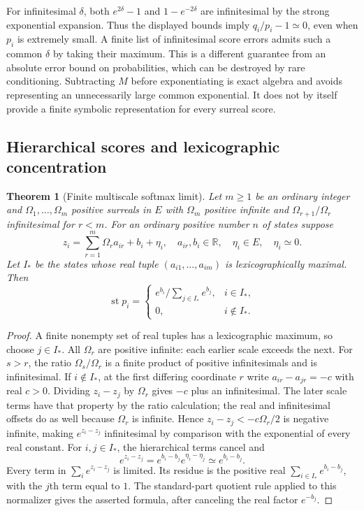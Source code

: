 \documentclass[11pt,a4paper]{article}
\numberwithin{equation}{section}
\newtheorem{theorem}{Theorem}[section]
\theoremstyle{definition}
\theoremstyle{remark}
\newcommand{\R}{\mathbb R}
\newcommand{\st}{\operatorname{st}}
\begin{document}
For infinitesimal $\delta$, both $e^{2\delta}-1$ and
$1-e^{-2\delta}$ are infinitesimal by the strong exponential expansion.
Thus the displayed bounds imply $q_i/p_i-1\simeq0$, even when $p_i$
is extremely small. A finite list of infinitesimal score errors admits
such a common $\delta$ by taking their maximum. This is a different guarantee from
an absolute error bound on probabilities, which can be destroyed by rare
conditioning. Subtracting $M$ before exponentiating is exact algebra and
avoids representing an unnecessarily large common exponential. It does
not by itself provide a finite symbolic representation for every surreal
score.

\subsection{Hierarchical scores and lexicographic concentration}

\begin{theorem}[Finite multiscale softmax limit]\label{fsp:thm:multisoft}
Let $m\ge1$ be an ordinary integer and
$\Omega_1,\ldots,\Omega_m$ positive surreals in $E$ with
$\Omega_m$ positive infinite and
$\Omega_{r+1}/\Omega_r$ infinitesimal for $r<m$. For an ordinary
positive number $n$ of states suppose
\begin{equation}
 z_i=\sum_{r=1}^m\Omega_r a_{ir}+b_i+\eta_i,
 \quad a_{ir},b_i\in\R,\quad \eta_i\in E,\quad \eta_i\simeq0.
\end{equation}
Let $I_*$ be the states whose real tuple
$(a_{i1},\ldots,a_{im})$ is lexicographically maximal. Then
\begin{equation}\label{fsp:eq:multisoft}
 \st p_i=
 \begin{cases}
 e^{b_i}/\sum_{j\in I_*}e^{b_j},&i\in I_*,\\
 0,&i\notin I_*.
 \end{cases}
\end{equation}
\end{theorem}
\begin{proof}
A finite nonempty set of real tuples has a lexicographic maximum,
so choose $j\in I_*$. All $\Omega_r$ are positive infinite: each
earlier scale exceeds the next. For $s>r$, the ratio
$\Omega_s/\Omega_r$ is a finite product of positive infinitesimals
and is infinitesimal.
If $i\notin I_*$, at the first differing coordinate $r$ write
$a_{ir}-a_{jr}=-c$ with real $c>0$. Dividing $z_i-z_j$ by $\Omega_r$
gives $-c$ plus an infinitesimal. The later scale terms have that property
by the ratio calculation; the real and infinitesimal offsets do as well
because $\Omega_r$ is infinite. Hence
$z_i-z_j<-c\Omega_r/2$ is negative infinite, making $e^{z_i-z_j}$
infinitesimal by comparison with the exponential of every real constant.
For $i,j\in I_*$, the hierarchical terms cancel and
\[
 e^{z_i-z_j}=e^{b_i-b_j}e^{\eta_i-\eta_j}
 \simeq e^{b_i-b_j}.
\]
Every term in $\sum_i e^{z_i-z_j}$ is limited. Its residue is the
positive real $\sum_{i\in I_*}e^{b_i-b_j}$, with the $j$th term equal
to $1$. The standard-part quotient rule applied to this normalizer gives
the asserted formula, after canceling the real factor $e^{-b_j}$.
\end{proof}
\end{document}
